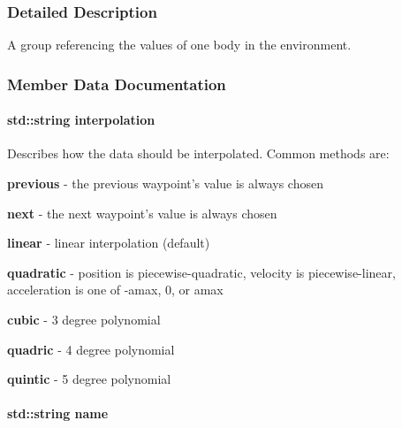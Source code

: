 \subsubsection{Detailed Description}
A group referencing the values of one body in the environment. 

\subsubsection{Member Data Documentation}
\hypertarget{classOpenRAVE_1_1ConfigurationSpecification_1_1Group_ac5505c39cf473d93d9ef8690d181d007}{
\paragraph[{interpolation}]{\setlength{\rightskip}{0pt plus 5cm}std::string {\bf interpolation}}\hfill}
\label{classOpenRAVE_1_1ConfigurationSpecification_1_1Group_ac5505c39cf473d93d9ef8690d181d007}


Describes how the data should be interpolated. Common methods are: 


\begin{DoxyItemize}
\item {\bfseries previous} -\/ the previous waypoint's value is always chosen
\item {\bfseries next} -\/ the next waypoint's value is always chosen
\item {\bfseries linear} -\/ linear interpolation (default)
\item {\bfseries quadratic} -\/ position is piecewise-\/quadratic, velocity is piecewise-\/linear, acceleration is one of -\/amax, 0, or amax
\item {\bfseries cubic} -\/ 3 degree polynomial
\item {\bfseries quadric} -\/ 4 degree polynomial
\item {\bfseries quintic} -\/ 5 degree polynomial 
\end{DoxyItemize}\hypertarget{classOpenRAVE_1_1ConfigurationSpecification_1_1Group_a9b45b3e13bd9167aab02e17e08916231}{
\paragraph[{name}]{\setlength{\rightskip}{0pt plus 5cm}std::string {\bf name}}\hfill}
\label{classOpenRAVE_1_1ConfigurationSpecification_1_1Group_a9b45b3e13bd9167aab02e17e08916231}


